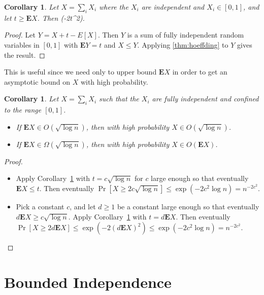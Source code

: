 \documentclass[11pt,a4paper]{article}
\newtheorem{corollary}[theorem]{Corollary}
\newcommand*{\E}[0]{\mathbf{E}}
\def\[#1\]{\begin{align*}#1\end{align*}}
\begin{document}
\begin{tcolorbox}
  \begin{corollary}
    \label{cor:chernoff-simple}
    Let \(X = \sum_i X_i\) where the \(X_i\) are independent and \(X_i \in [0, 1]\), and let $t \ge \E X$.
    Then \[\Pr[X \ge 2t] \le \exp(-2t^2).\]
  \end{corollary}
\end{tcolorbox}
\begin{proof}
  Let \(Y = X + t - E[X]\).
  Then \(Y\) is a sum of fully independent random variables in \([0, 1]\) with \(\E Y = t\) and $X \le Y$.
  Applying \cref{thm:hoeffding} to \(Y\) gives the result.
\end{proof}

This is useful since we need only to upper bound $\E X$ in order to get an asymptotic bound on $X$ with high probability.

\begin{tcolorbox}
  \begin{corollary}
    Let \(X = \sum_i X_i\) such that the \(X_i\) are fully independent and confined to the range \([0, 1]\).
    \begin{itemize}
    \item If \(\E X \in O(\sqrt{\log n})\), then with high probability \(X \in O(\sqrt{\log n})\).
    \item If \(\E X \in \Omega(\sqrt{\log n})\), then with high probability \(X \in O(\E X)\).
    \end{itemize}
  \end{corollary}
\end{tcolorbox}
\begin{proof}\hfill
  \begin{itemize}
  \item
    Apply Corollary~\ref{cor:chernoff-simple} with \(t = c \sqrt{\log n}\) for \(c\) large enough so that eventually \(\E X \le t\).
    Then eventually \(\Pr[X \ge 2c \sqrt{\log n}] \le \exp(-2c^2 \log n) = n^{-2c^2}\).
  \item
    Pick a constant \(c\),
    and let \(d \ge 1\) be a constant large enough so that eventually \(d \E X \ge c \sqrt{\log n}\).
    Apply Corollary~\ref{cor:chernoff-simple} with \(t = d \E X\).
    Then eventually \(\Pr[X \ge 2d\E X] \le \exp(-2(d \E X)^2) \le \exp(-2c^2\log n) = n^{-2c^2}\).
  \end{itemize}
\end{proof}

\section{Bounded Independence}
\end{document}
